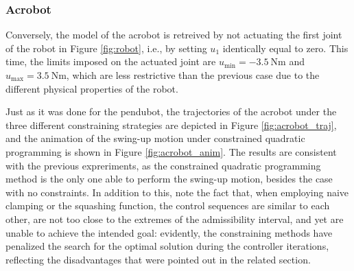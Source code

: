 \begin{multicols}{2}

\subsubsection{Acrobot}
Conversely, the model of the acrobot is retreived by not actuating the first joint of the robot in Figure \ref{fig:robot}, i.e., by setting $u_1$ identically equal to zero. This time, the limits imposed on the actuated joint are $u_{\text{min}} = -\SI{3.5}{\newton\meter}$ and $u_{\text{max}} = \SI{3.5}{\newton\meter}$, which are less restrictive than the previous case due to the different physical properties of the robot.

Just as it was done for the pendubot, the trajectories of the acrobot under the three different constraining strategies are depicted in Figure \ref{fig:acrobot_traj}, and the animation of the swing-up motion under constrained quadratic programming is shown in Figure \ref{fig:acrobot_anim}. The results are consistent with the previous expreriments, as the constrained quadratic programming method is the only one able to perform the swing-up motion, besides the case with no constraints. In addition to this, note the fact that, when employing naive clamping or the squashing function, the control sequences are similar to each other, are not too close to the extremes of the admissibility interval, and yet are unable to achieve the intended goal: evidently, the constraining methods have penalized the search for the optimal solution during the controller iterations, reflecting the disadvantages that were pointed out in the related section.

\end{multicols}
